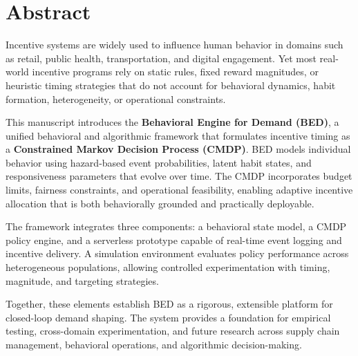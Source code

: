\chapter*{Abstract}

Incentive systems are widely used to influence human behavior in domains such as retail, public health, transportation, and digital engagement. Yet most real-world incentive programs rely on static rules, fixed reward magnitudes, or heuristic timing strategies that do not account for behavioral dynamics, habit formation, heterogeneity, or operational constraints.

This manuscript introduces the \textbf{Behavioral Engine for Demand (BED)}, a unified behavioral and algorithmic framework that formulates incentive timing as a \textbf{Constrained Markov Decision Process (CMDP)}. BED models individual behavior using hazard-based event probabilities, latent habit states, and responsiveness parameters that evolve over time. The CMDP incorporates budget limits, fairness constraints, and operational feasibility, enabling adaptive incentive allocation that is both behaviorally grounded and practically deployable.

The framework integrates three components: a behavioral state model, a CMDP policy engine, and a serverless prototype capable of real-time event logging and incentive delivery. A simulation environment evaluates policy performance across heterogeneous populations, allowing controlled experimentation with timing, magnitude, and targeting strategies.

Together, these elements establish BED as a rigorous, extensible platform for closed-loop demand shaping. The system provides a foundation for empirical testing, cross-domain experimentation, and future research across supply chain management, behavioral operations, and algorithmic decision-making.
